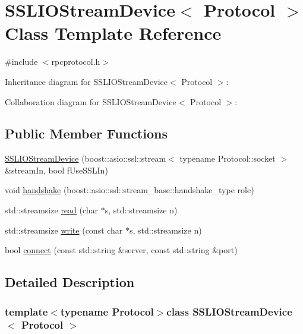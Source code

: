 \hypertarget{class_s_s_l_i_o_stream_device}{}\section{S\+S\+L\+I\+O\+Stream\+Device$<$ Protocol $>$ Class Template Reference}
\label{class_s_s_l_i_o_stream_device}


{\ttfamily \#include $<$rpcprotocol.\+h$>$}



Inheritance diagram for S\+S\+L\+I\+O\+Stream\+Device$<$ Protocol $>$\+:


Collaboration diagram for S\+S\+L\+I\+O\+Stream\+Device$<$ Protocol $>$\+:
\subsection*{Public Member Functions}
\begin{DoxyCompactItemize}
\item 
\hyperlink{class_s_s_l_i_o_stream_device_a603e5709babdeaaa68c159a2895d7f2e}{S\+S\+L\+I\+O\+Stream\+Device} (boost\+::asio\+::ssl\+::stream$<$ typename Protocol\+::socket $>$ \&stream\+In, bool f\+Use\+S\+S\+L\+In)
\item 
void \hyperlink{class_s_s_l_i_o_stream_device_a6607d02de410f1c731bf1dcf3bac9bb5}{handshake} (boost\+::asio\+::ssl\+::stream\+\_\+base\+::handshake\+\_\+type role)
\item 
std\+::streamsize \hyperlink{class_s_s_l_i_o_stream_device_a8beb626f163adac311a5ec507c3e495a}{read} (char $\ast$s, std\+::streamsize n)
\item 
std\+::streamsize \hyperlink{class_s_s_l_i_o_stream_device_aa4bfad893484ffdf9dbcdce97c462ad0}{write} (const char $\ast$s, std\+::streamsize n)
\item 
bool \hyperlink{class_s_s_l_i_o_stream_device_acdded14a6c79e263989ebf8aea392405}{connect} (const std\+::string \&server, const std\+::string \&port)
\end{DoxyCompactItemize}


\subsection{Detailed Description}
\subsubsection*{template$<$typename Protocol$>$class S\+S\+L\+I\+O\+Stream\+Device$<$ Protocol $>$}



